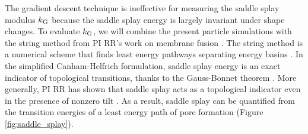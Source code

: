 %
The gradient descent technique is ineffective for measuring the saddle splay modulus $k_{\mathrm{G}}$ because
the saddle splay energy is largely invariant under shape changes.
To evaluate $k_{\mathrm{G}}$, we will combine the present particle simulations with the string method 
from PI RR's work on membrane fusion \cite{RyKlYaCo16}. The string method is a numerical scheme that finds
least energy pathways separating energy basins \cite{doi:10.1063/1.2720838}. 
In the simplified Canham-Helfrich formulation, saddle splay energy is an exact indicator of topological transitions, 
thanks to the  Gauss-Bonnet theorem \cite{TerziDeserno17}.
More generally, PI RR has shown that saddle splay acts as a topological indicator even in the presence of nonzero tilt \cite{RyKlYaCo16}. 
As a result, saddle splay can be quantified from the transition energies of a least energy path of pore formation (Figure \ref{fig:saddle_splay}).   
%
%


